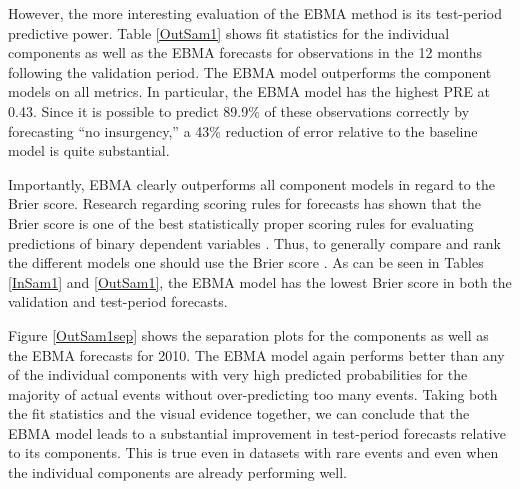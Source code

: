 However, the more interesting evaluation of the EBMA method is its
test-period predictive power. Table \ref{OutSam1} shows fit statistics
for the individual components as well as the EBMA forecasts for
observations in the 12 months following the validation period.  The
EBMA model outperforms the component models on all metrics.  In
particular, the EBMA model has the highest PRE at 0.43.  Since it is
possible to predict 89.9\% of these observations correctly by
forecasting ``no insurgency,'' a 43\% reduction of error relative to
the baseline model is quite substantial.



Importantly, EBMA clearly outperforms all component models in regard
to the Brier score. Research regarding scoring rules for forecasts has
shown that the Brier score is one of the best statistically proper
scoring rules for evaluating predictions of binary dependent variables
\citep{Gneiting_Raftery_2007}.  Thus, to generally compare and rank
the different models one should use the Brier score
\citep{Gneiting_Raftery_2007}. As can be seen in Tables \ref{InSam1}
and \ref{OutSam1}, the EBMA model has the lowest Brier score in both
the validation and test-period forecasts.

Figure \ref{OutSam1sep} shows the separation plots for the components
as well as the EBMA forecasts for 2010.  The EBMA model again performs
better than any of the individual components with very high predicted
probabilities for the majority of actual events without
over-predicting too many events.  Taking both the fit statistics and
the visual evidence together, we can conclude that the EBMA model
leads to a substantial improvement in test-period forecasts relative
to its components.  This is true even in datasets with rare events and
even when the individual components are already performing well.

